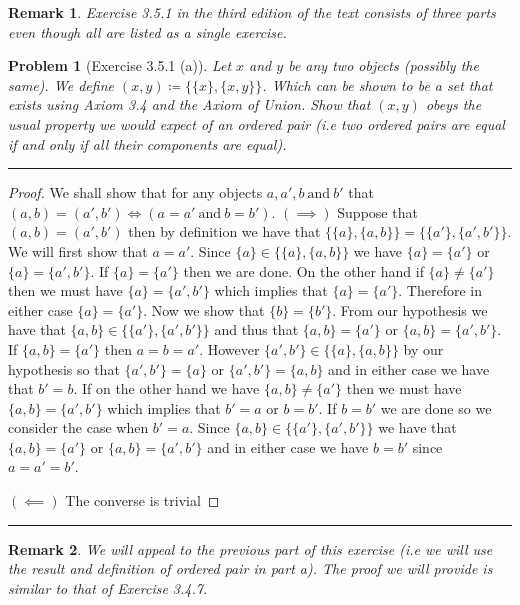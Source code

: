 \documentclass{article}
\newcommand{\lined}{\noindent\rule{\textwidth}{1pt}}
\newtheorem*{problem}{Problem}
\newtheorem*{remark}{Remark}
\begin{document}
	\newpage
	
	\begin{remark}
		Exercise 3.5.1 in the third edition of the text consists of three parts even though all are listed as
		a single exercise.
	\end{remark}

	\begin{problem}[Exercise 3.5.1 (a)]
		Let $x$ and $y$ be any two objects (possibly the same). We define $(x,y) \coloneqq  \{\{x\},\{x,y\}\}$. Which can be shown to be a set that exists using Axiom 3.4 and the Axiom of Union. Show that $(x,y)$ obeys the usual property we would expect of an ordered pair (i.e two ordered pairs are equal if and only if all their components are equal).
	\end{problem}

	\lined
	\begin{proof}
		We shall show that for any objects $a,a',b\ \text{and}\  b'$ that $(a,b) = (a',b') \iff (a = a'\ \text{and}\ b = b')$.
		$(\implies)$ Suppose that $(a,b) = (a',b')$ then by definition we have that $\{\{a\},\{a,b\}\} = \{\{a'\},\{a',b'\}\}$. We will first show that $a = a'$. Since $\{a\} \in \{\{a\},\{a,b\}\}$ we have $\{a\} = \{a'\}$ or $\{a\} = \{a',b'\}$. If $\{a\} = \{a'\}$ then we are done. On the other hand if $\{a\} \neq \{a'\}$ then we must have $\{a\} = \{a',b'\}$ which implies that $\{a\} = \{a'\}$. Therefore in either case $\{a\} = \{a'\}$. Now we show that $\{b\} = \{b'\}$. From our hypothesis we have that $\{a,b\} \in \{\{a'\},\{a',b'\}\}$ and thus that
		$\{a,b\} = \{a'\}$ or $\{a,b\} = \{a',b'\}$. If $\{a,b\} = \{a'\}$ then $a = b = a'$. However $\{a',b'\} \in \{\{a\},\{a,b\}\}$ by our hypothesis so that $\{a',b'\} = \{a\}$ or $\{a',b'\} = \{a,b\}$ and in either case we have that $b' = b$. If on the other hand we have
		$\{a,b\} \neq \{a'\}$ then we must have $\{a,b\} = \{a',b'\}$ which implies that $b' = a$ or $b = b'$. If $b = b'$ we are done so we  consider the case when $b' = a$. Since $\{a,b\} \in \{\{a'\},\{a',b'\}\}$ we have that 
		$\{a,b\} = \{a'\}$ or $\{a,b\} = \{a',b'\}$ and in either case we have $b = b'$ since $a = a' = b'$.
		\linebreak
		
		\noindent $(\impliedby)$ The converse is trivial
	\end{proof}
	\lined
	
	\newpage
	
	\begin{remark}
		We will appeal to the previous part of this exercise (i.e we will use the result and definition of ordered pair in part a). The proof
		we will provide is similar to that of Exercise 3.4.7. 
	\end{remark}
\end{document}
